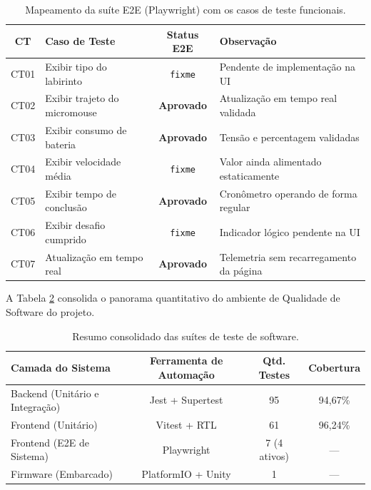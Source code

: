 \begin{table}[H]
\centering
\small
\renewcommand{\arraystretch}{1.2}
\caption{Mapeamento da suíte E2E (Playwright) com os casos de teste funcionais.}
\label{tab:mapeamento-ct-e2e}
\begin{tabularx}{\linewidth}{|c|l|c|X|}
\hline
\textbf{CT} & \textbf{Caso de Teste} & \textbf{Status E2E} & \textbf{Observação} \\ \hline
CT01 & Exibir tipo do labirinto & \texttt{fixme} & Pendente de implementação na UI \\ \hline
CT02 & Exibir trajeto do micromouse & \textbf{Aprovado} & Atualização em tempo real validada \\ \hline
CT03 & Exibir consumo de bateria & \textbf{Aprovado} & Tensão e percentagem validadas \\ \hline
CT04 & Exibir velocidade média & \texttt{fixme} & Valor ainda alimentado estaticamente \\ \hline
CT05 & Exibir tempo de conclusão & \textbf{Aprovado} & Cronômetro operando de forma regular \\ \hline
CT06 & Exibir desafio cumprido & \texttt{fixme} & Indicador lógico pendente na UI \\ \hline
CT07 & Atualização em tempo real & \textbf{Aprovado} & Telemetria sem recarregamento da página \\ \hline
\end{tabularx}
\end{table}

A Tabela \ref{tab:resumo-testes} consolida o panorama quantitativo do ambiente de Qualidade de Software do projeto.

\begin{table}[H]
\centering
\small
\renewcommand{\arraystretch}{1.2}
\caption{Resumo consolidado das suítes de teste de software.}
\label{tab:resumo-testes}
\begin{tabularx}{\linewidth}{|X|c|c|c|}
\hline
\textbf{Camada do Sistema} & \textbf{Ferramenta de Automação} & \textbf{Qtd. Testes} & \textbf{Cobertura} \\ \hline
Backend (Unitário e Integração) & Jest + Supertest & 95 & 94,67\% \\ \hline
Frontend (Unitário) & Vitest + RTL & 61 & 96,24\% \\ \hline
Frontend (E2E de Sistema) & Playwright & 7 (4 ativos) & --- \\ \hline
Firmware (Embarcado) & PlatformIO + Unity & 1 & --- \\ \hline
\end{tabularx}
\end{table}

